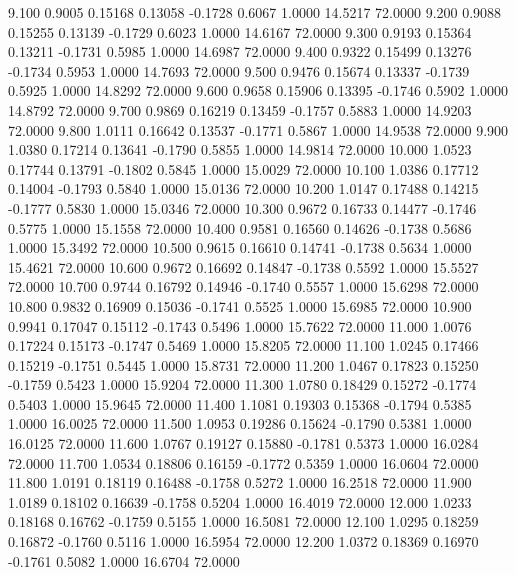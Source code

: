    9.100   0.9005   0.15168   0.13058  -0.1728   0.6067   1.0000  14.5217  72.0000
   9.200   0.9088   0.15255   0.13139  -0.1729   0.6023   1.0000  14.6167  72.0000
   9.300   0.9193   0.15364   0.13211  -0.1731   0.5985   1.0000  14.6987  72.0000
   9.400   0.9322   0.15499   0.13276  -0.1734   0.5953   1.0000  14.7693  72.0000
   9.500   0.9476   0.15674   0.13337  -0.1739   0.5925   1.0000  14.8292  72.0000
   9.600   0.9658   0.15906   0.13395  -0.1746   0.5902   1.0000  14.8792  72.0000
   9.700   0.9869   0.16219   0.13459  -0.1757   0.5883   1.0000  14.9203  72.0000
   9.800   1.0111   0.16642   0.13537  -0.1771   0.5867   1.0000  14.9538  72.0000
   9.900   1.0380   0.17214   0.13641  -0.1790   0.5855   1.0000  14.9814  72.0000
  10.000   1.0523   0.17744   0.13791  -0.1802   0.5845   1.0000  15.0029  72.0000
  10.100   1.0386   0.17712   0.14004  -0.1793   0.5840   1.0000  15.0136  72.0000
  10.200   1.0147   0.17488   0.14215  -0.1777   0.5830   1.0000  15.0346  72.0000
  10.300   0.9672   0.16733   0.14477  -0.1746   0.5775   1.0000  15.1558  72.0000
  10.400   0.9581   0.16560   0.14626  -0.1738   0.5686   1.0000  15.3492  72.0000
  10.500   0.9615   0.16610   0.14741  -0.1738   0.5634   1.0000  15.4621  72.0000
  10.600   0.9672   0.16692   0.14847  -0.1738   0.5592   1.0000  15.5527  72.0000
  10.700   0.9744   0.16792   0.14946  -0.1740   0.5557   1.0000  15.6298  72.0000
  10.800   0.9832   0.16909   0.15036  -0.1741   0.5525   1.0000  15.6985  72.0000
  10.900   0.9941   0.17047   0.15112  -0.1743   0.5496   1.0000  15.7622  72.0000
  11.000   1.0076   0.17224   0.15173  -0.1747   0.5469   1.0000  15.8205  72.0000
  11.100   1.0245   0.17466   0.15219  -0.1751   0.5445   1.0000  15.8731  72.0000
  11.200   1.0467   0.17823   0.15250  -0.1759   0.5423   1.0000  15.9204  72.0000
  11.300   1.0780   0.18429   0.15272  -0.1774   0.5403   1.0000  15.9645  72.0000
  11.400   1.1081   0.19303   0.15368  -0.1794   0.5385   1.0000  16.0025  72.0000
  11.500   1.0953   0.19286   0.15624  -0.1790   0.5381   1.0000  16.0125  72.0000
  11.600   1.0767   0.19127   0.15880  -0.1781   0.5373   1.0000  16.0284  72.0000
  11.700   1.0534   0.18806   0.16159  -0.1772   0.5359   1.0000  16.0604  72.0000
  11.800   1.0191   0.18119   0.16488  -0.1758   0.5272   1.0000  16.2518  72.0000
  11.900   1.0189   0.18102   0.16639  -0.1758   0.5204   1.0000  16.4019  72.0000
  12.000   1.0233   0.18168   0.16762  -0.1759   0.5155   1.0000  16.5081  72.0000
  12.100   1.0295   0.18259   0.16872  -0.1760   0.5116   1.0000  16.5954  72.0000
  12.200   1.0372   0.18369   0.16970  -0.1761   0.5082   1.0000  16.6704  72.0000
